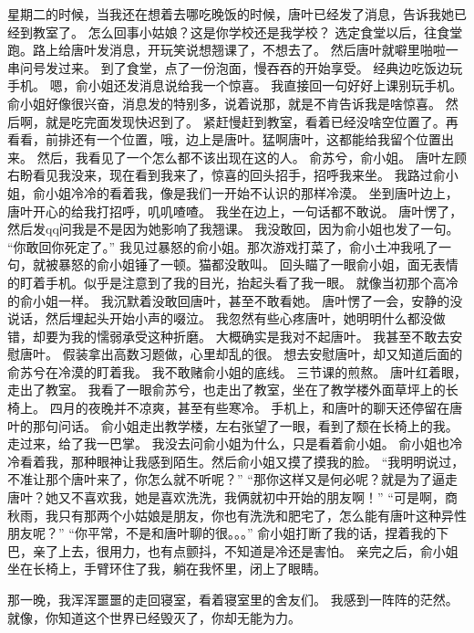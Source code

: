 星期二的时候，当我还在想着去哪吃晚饭的时候，唐叶已经发了消息，告诉我她已经到教室了。
怎么回事小姑娘？这是你学校还是我学校？
选定食堂以后，往食堂跑。路上给唐叶发消息，开玩笑说想翘课了，不想去了。
然后唐叶就噼里啪啦一串问号发过来。
到了食堂，点了一份泡面，慢吞吞的开始享受。
经典边吃饭边玩手机。
嗯，俞小姐还发消息说给我一个惊喜。
我直接回一句好好上课别玩手机。
俞小姐好像很兴奋，消息发的特别多，说着说那，就是不肯告诉我是啥惊喜。
然后啊，就是吃完面发现快迟到了。
紧赶慢赶到教室，看着已经没啥空位置了。再看看，前排还有一个位置，哦，边上是唐叶。猛啊唐叶，这都能给我留个位置出来。
然后，我看见了一个怎么都不该出现在这的人。
俞苏兮，俞小姐。
唐叶左顾右盼看见我没来，现在看到我来了，惊喜的回头招手，招呼我来坐。
我路过俞小姐，俞小姐冷冷的看着我，像是我们一开始不认识的那样冷漠。
坐到唐叶边上，唐叶开心的给我打招呼，叽叽喳喳。
我坐在边上，一句话都不敢说。
唐叶愣了，然后发qq问我是不是因为她影响了我翘课。
我没敢回，因为俞小姐也发了一句。
“你敢回你死定了。”
我见过暴怒的俞小姐。那次游戏打菜了，俞小土冲我吼了一句，就被暴怒的俞小姐锤了一顿。猫都没敢叫。
回头瞄了一眼俞小姐，面无表情的盯着手机。似乎是注意到了我的目光，抬起头看了我一眼。
就像当初那个高冷的俞小姐一样。
我沉默着没敢回唐叶，甚至不敢看她。
唐叶愣了一会，安静的没说话，然后埋起头开始小声的啜泣。
我忽然有些心疼唐叶，她明明什么都没做错，却要为我的懦弱承受这种折磨。
大概确实是我对不起唐叶。
我甚至不敢去安慰唐叶。
假装拿出高数习题做，心里却乱的很。
想去安慰唐叶，却又知道后面的俞苏兮在冷漠的盯着我。
我不敢赌俞小姐的底线。
三节课的煎熬。
唐叶红着眼，走出了教室。
我看了一眼俞苏兮，也走出了教室，坐在了教学楼外面草坪上的长椅上。
四月的夜晚并不凉爽，甚至有些寒冷。
手机上，和唐叶的聊天还停留在唐叶的那句问话。
俞小姐走出教学楼，左右张望了一眼，看到了颓在长椅上的我。走过来，给了我一巴掌。
我没去问俞小姐为什么，只是看着俞小姐。
俞小姐也冷冷看着我，那种眼神让我感到陌生。然后俞小姐又摸了摸我的脸。
“我明明说过，不准让那个唐叶来了，你怎么就不听呢？”
“那你这样又是何必呢？就是为了逼走唐叶？她又不喜欢我，她是喜欢洗洗，我俩就初中开始的朋友啊！”
“可是啊，商秋雨，我只有那两个小姑娘是朋友，你也有洗洗和肥宅了，怎么能有唐叶这种异性朋友呢？”
“你平常，不是和唐叶聊的很。。。”
俞小姐打断了我的话，捏着我的下巴，亲了上去，很用力，也有点颤抖，不知道是冷还是害怕。
亲完之后，俞小姐坐在长椅上，手臂环住了我，躺在我怀里，闭上了眼睛。

那一晚，我浑浑噩噩的走回寝室，看着寝室里的舍友们。
我感到一阵阵的茫然。
就像，你知道这个世界已经毁灭了，你却无能为力。

